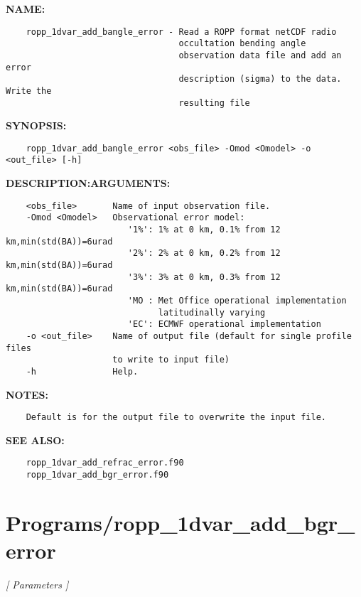 \label{ch:robo42}
\label{ch:Programs_ropp_1dvar_add_bangle_error}
\textbf{NAME:}\hspace{0.08in}\begin{Verbatim}
    ropp_1dvar_add_bangle_error - Read a ROPP format netCDF radio
                                  occultation bending angle
                                  observation data file and add an error
                                  description (sigma) to the data. Write the
                                  resulting file
\end{Verbatim}
\textbf{SYNOPSIS:}\hspace{0.08in}\begin{Verbatim}
    ropp_1dvar_add_bangle_error <obs_file> -Omod <Omodel> -o <out_file> [-h]
\end{Verbatim}
\textbf{DESCRIPTION:}\hspace{0.08in}\textbf{ARGUMENTS:}\hspace{0.08in}\begin{Verbatim}
    <obs_file>       Name of input observation file.
    -Omod <Omodel>   Observational error model:
                        '1%': 1% at 0 km, 0.1% from 12 km,min(std(BA))=6urad
                        '2%': 2% at 0 km, 0.2% from 12 km,min(std(BA))=6urad
                        '3%': 3% at 0 km, 0.3% from 12 km,min(std(BA))=6urad
                        'MO : Met Office operational implementation
                              latitudinally varying
                        'EC': ECMWF operational implementation
    -o <out_file>    Name of output file (default for single profile files
                     to write to input file)
    -h               Help.
\end{Verbatim}
\textbf{NOTES:}\hspace{0.08in}\begin{Verbatim}
    Default is for the output file to overwrite the input file.
\end{Verbatim}
\textbf{SEE ALSO:}\hspace{0.08in}\begin{Verbatim}
    ropp_1dvar_add_refrac_error.f90
    ropp_1dvar_add_bgr_error.f90
\end{Verbatim}
\section{Programs/ropp\_1dvar\_add\_bgr\_error}
\textsl{[ Parameters ]}

